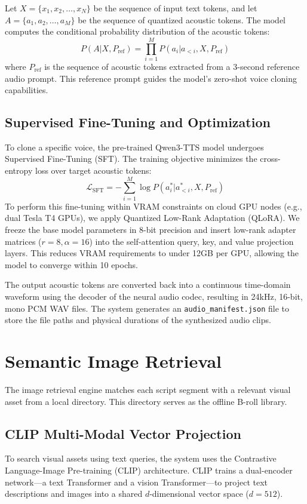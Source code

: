 \documentclass[a4paper,12pt]{report}
\begin{document}
Let $X = \{x_1, x_2, \dots, x_N\}$ be the sequence of input text tokens, and let $A = \{a_1, a_2, \dots, a_M\}$ be the sequence of quantized acoustic tokens. The model computes the conditional probability distribution of the acoustic tokens:
\begin{equation}
    P(A | X, P_{\text{ref}}) = \prod_{i=1}^M P(a_i | a_{<i}, X, P_{\text{ref}})
    \label{eq:tts_prob}
\end{equation}
where $P_{\text{ref}}$ is the sequence of acoustic tokens extracted from a 3-second reference audio prompt. This reference prompt guides the model's zero-shot voice cloning capabilities.

\subsection{Supervised Fine-Tuning and Optimization}
To clone a specific voice, the pre-trained Qwen3-TTS model undergoes Supervised Fine-Tuning (SFT). The training objective minimizes the cross-entropy loss over target acoustic tokens:
\begin{equation}
    \mathcal{L}_{\text{SFT}} = - \sum_{i=1}^M \log P(a_i^* | a_{<i}^*, X, P_{\text{ref}})
    \label{eq:sft_loss}
\end{equation}
To perform this fine-tuning within VRAM constraints on cloud GPU nodes (e.g., dual Tesla T4 GPUs), we apply Quantized Low-Rank Adaptation (QLoRA). We freeze the base model parameters in 8-bit precision and insert low-rank adapter matrices ($r = 8, \alpha = 16$) into the self-attention query, key, and value projection layers. This reduces VRAM requirements to under 12GB per GPU, allowing the model to converge within 10 epochs.

The output acoustic tokens are converted back into a continuous time-domain waveform using the decoder of the neural audio codec, resulting in 24kHz, 16-bit, mono PCM WAV files. The system generates an \texttt{audio\_manifest.json} file to store the file paths and physical durations of the synthesized audio clips.

\section{Semantic Image Retrieval}
The image retrieval engine matches each script segment with a relevant visual asset from a local directory. This directory serves as the offline B-roll library.

\subsection{CLIP Multi-Modal Vector Projection}
To search visual assets using text queries, the system uses the Contrastive Language-Image Pre-training (CLIP) architecture. CLIP trains a dual-encoder network—a text Transformer and a vision Transformer—to project text descriptions and images into a shared $d$-dimensional vector space ($d = 512$).
\end{document}
